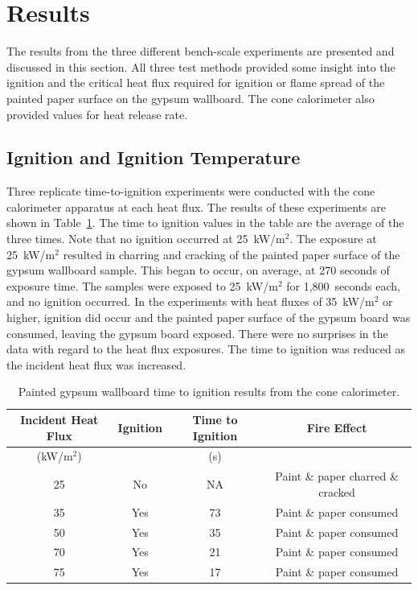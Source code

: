 \documentclass[twoside]{uocthesis}
\begin{document}
{\section{Results}

The results from the three different bench-scale experiments are presented and discussed in this section.  All three test methods provided some insight into the ignition and the critical heat flux required for ignition or flame spread of the painted paper surface on the gypsum wallboard.  The cone calorimeter also provided values for heat release rate.   

\subsection{Ignition and Ignition Temperature}

Three replicate time-to-ignition experiments were conducted with the cone calorimeter apparatus at each heat flux.  The results of these experiments are shown in Table~\ref{tab:Gypsum_wallboard_timetoign}.  The time to ignition values in the table are the average of the three times.  Note that no ignition occurred at 25~kW/m$^2$.  The exposure at 25~kW/m$^2$ resulted in charring and cracking of the painted paper surface of the gypsum wallboard sample.  This began to occur, on average, at 270 seconds of exposure time. The samples were exposed to 25~kW/m$^2$ for 1,800~seconds each, and no ignition occurred.  In the experiments with heat fluxes of 35~kW/m$^2$ or higher, ignition did occur and the painted paper surface of the gypsum board was consumed, leaving the gypsum board exposed.  There were no surprises in the data with regard to the heat flux exposures.  The time to ignition was reduced as the incident heat flux was increased.   


\begin{table}
	\centering
	\begin{tabular}{|c|c|c|c|}
		\hline Incident Heat Flux & Ignition & Time to Ignition &  Fire Effect  \\
		\hline (kW/m$^2$) &  & (s)  &   \\ 
		\hline 25	& No 	& NA 		& Paint \& paper charred \& cracked \\
		\hline 35 	& Yes 	& 73	 	& Paint \& paper consumed \\
		\hline 50	& Yes 	& 35 	 	& Paint \& paper consumed   \\
		\hline 70	& Yes 	& 21 	 	& Paint \& paper consumed \\
		\hline 75	& Yes 	& 17 		& Paint \& paper consumed \\
		\hline
	\end{tabular}
	\caption[Painted gypsum wallboard time to ignition results.]{Painted gypsum wallboard time to ignition results from the cone calorimeter.}
	\label{tab:Gypsum_wallboard_timetoign}
\end{table}

}
\end{document}
